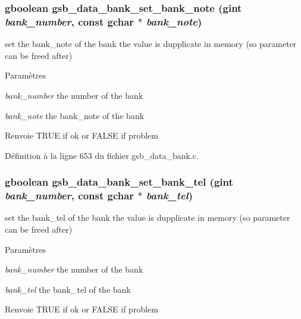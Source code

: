 \subsubsection[{gsb\_\-data\_\-bank\_\-set\_\-bank\_\-note}]{\setlength{\rightskip}{0pt plus 5cm}gboolean gsb\_\-data\_\-bank\_\-set\_\-bank\_\-note (gint {\em bank\_\-number}, \/  const gchar $\ast$ {\em bank\_\-note})}\label{gsb__data__bank_8h_af043f3823b95d7ea72402a5883411032}
set the bank\_\-note of the bank the value is dupplicate in memory (so parameter can be freed after)


\begin{DoxyParams}{Paramètres}
\item[{\em bank\_\-number}]the number of the bank \item[{\em bank\_\-note}]the bank\_\-note of the bank\end{DoxyParams}
\begin{DoxyReturn}{Renvoie}
TRUE if ok or FALSE if problem 
\end{DoxyReturn}


Définition à la ligne 653 du fichier gsb\_\-data\_\-bank.c.

\subsubsection[{gsb\_\-data\_\-bank\_\-set\_\-bank\_\-tel}]{\setlength{\rightskip}{0pt plus 5cm}gboolean gsb\_\-data\_\-bank\_\-set\_\-bank\_\-tel (gint {\em bank\_\-number}, \/  const gchar $\ast$ {\em bank\_\-tel})}\label{gsb__data__bank_8h_aeee694aad5e5d3b0459de034d1692f08}
set the bank\_\-tel of the bank the value is dupplicate in memory (so parameter can be freed after)


\begin{DoxyParams}{Paramètres}
\item[{\em bank\_\-number}]the number of the bank \item[{\em bank\_\-tel}]the bank\_\-tel of the bank\end{DoxyParams}
\begin{DoxyReturn}{Renvoie}
TRUE if ok or FALSE if problem 
\end{DoxyReturn}


